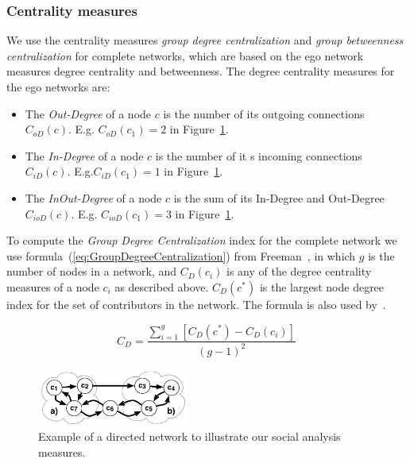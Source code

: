 \subsubsection{Centrality measures}
We use the centrality measures \emph{group degree centralization} and
\emph{group betweenness centralization} for complete networks, which are based on
the ego network measures degree centrality and betweenness. The degree
centrality measures for the ego networks are:

\begin{itemize}
  \item The \emph{Out-Degree} of a node $c$ is the
  number of its outgoing connections $C_{oD}(c)$. E.g. $C_{oD}(c_1)=2$ in 
  Figure~\ref{fig:CentralityExample}.
  
  \item The \emph{In-Degree} of a node $c$ is the
  number of it s incoming connections $C_{iD}(c)$. E.g.$C_{iD}(c_1)=1$ 
  in Figure~\ref{fig:CentralityExample}.
  
  \item The \emph{InOut-Degree} of a node $c$ is the sum of its In-Degree and
  Out-Degree $C_{ioD}(c)$. E.g. $C_{ioD}(c_1)=3$
  in Figure~\ref{fig:CentralityExample}.
\end{itemize}

To compute the \emph{Group Degree Centralization} index for the complete network
we use formula~(\ref{eq:GroupDegreeCentralization}) from
Freeman~\cite{Freeman:1979rl}, in which $g$ is the number of nodes in a network,
and $C_D(c_i)$ is any of the degree centrality measures of a node $c_i$ as
described above. $C_D(c^*)$ is the largest node degree index for the set of
contributors in the network. The formula is also used
by~\cite{Gloor:2003cikm,hinds:cscw:2006}.

\begin{equation}
\displaystyle C_D =  \frac{\sum_{i=1}^g[C_D(c^*) - C_D(c_i)]}{(g-1)^2}
\label{eq:GroupDegreeCentralization}
\end{equation}

\begin{figure}[t]
\begin{center}
\includegraphics[width=5.0cm]{figures/CentralityExample}
\vspace{-10pt}
\caption{Example of a directed network to illustrate our social
analysis measures.}
\label{fig:CentralityExample}
\end{center}
\end{figure}

